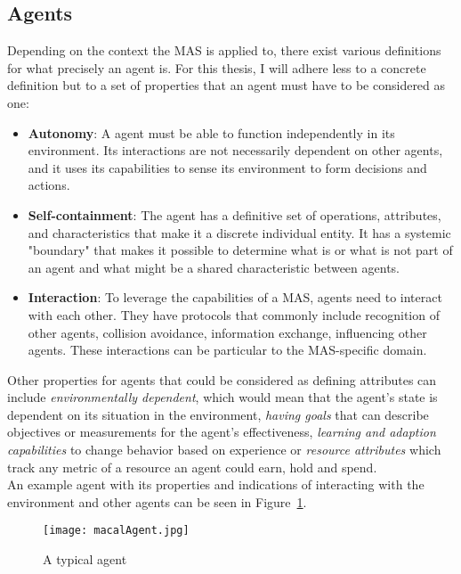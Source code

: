 \subsection{Agents}
Depending on the context the MAS is applied to, there exist various definitions for what precisely an agent is. For this thesis, I will adhere less to a concrete definition but to a set of properties that an agent must have to be considered as one:
\begin{itemize}
	\item \textbf{Autonomy}: A agent must be able to function independently in its environment. Its interactions are not necessarily dependent on other agents, and it uses its capabilities to sense its environment to form decisions and actions.
	\item \textbf{Self-containment}: The agent has a definitive set of operations, attributes, and characteristics that make it a discrete individual entity. It has a systemic "boundary" that makes it possible to determine what is or what is not part of an agent and what might be a shared characteristic between agents.
	\item \textbf{Interaction}: To leverage the capabilities of a MAS, agents need to interact with each other. They have protocols that commonly include recognition of other agents, collision avoidance, information exchange, influencing other agents. These interactions can be particular to the MAS-specific domain.
\end{itemize}
Other properties for agents that could be considered as defining attributes can include \textit{environmentally dependent}, which would mean that the agent's state is dependent on its situation in the environment, \textit{having goals} that can describe objectives or measurements for the agent's effectiveness, \textit{learning and adaption capabilities} to change behavior based on experience or \textit{resource attributes} which track any metric of a resource an agent could earn, hold and spend.~\cite{Macal2009}\\
An example agent with its properties and indications of interacting with the environment and other agents can be seen in Figure~\ref{fig:macalAgent}.
\begin{figure}
	\centering
	\texttt{[image: macalAgent.jpg]}
	\caption{A typical agent~\cite{Macal2009}}
	\label{fig:macalAgent}
\end{figure}
